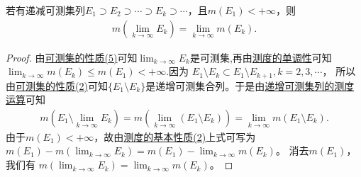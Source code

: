 \documentclass[../../main.tex]{subfiles}
\begin{document}
\begin{corollary}[递减可测集列的测度运算]\label{corollary:递减可测集列的测度运算}
若有递减可测集列$E_1\supset E_2\supset\cdots\supset E_k\supset\cdots$，且$m(E_1)<+\infty$，则
\begin{align}
m\left(\lim_{k\to\infty}E_k\right)=\lim_{k\to\infty}m(E_k).\label{eq:2.5}
\end{align}
\end{corollary}
\begin{proof}
由\hyperref[theorem:可测集的性质]{可测集的性质(5)}可知$\lim_{k\to\infty}E_k$是可测集,再由\hyperref[theorem:测度的基本性质]{测度的单调性}可知$\lim_{k\to\infty}m(E_k)\leq m(E_1)<+\infty$.因为
$E_1\setminus E_k\subset E_1\setminus E_{k + 1},k = 2,3,\cdots$，
所以由\hyperref[theorem:可测集的性质]{可测集的性质(2)}可知$\{E_1\setminus E_k\}$是递增可测集合列。于是由\hyperref[theorem:递增可测集列的测度运算]{递增可测集列的测度运算}可知
\begin{align*}
m\left(E_1\setminus\lim_{k\to\infty}E_k\right)=m\left(\lim_{k\to\infty}(E_1\setminus E_k)\right)
=\lim_{k\to\infty}m(E_1\setminus E_k).
\end{align*}
由于$m(E_1)<+\infty$，故由\hyperref[theorem:测度的基本性质]{测度的基本性质(2)}上式可写为
$m(E_1)-m\left(\lim_{k\to\infty}E_k\right)=m(E_1)-\lim_{k\to\infty}m(E_k)$。
消去$m(E_1)$，我们有
$m\left(\lim_{k\to\infty}E_k\right)=\lim_{k\to\infty}m(E_k)$。 
\end{proof}
\end{document}
